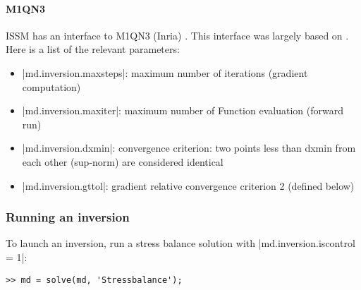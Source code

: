 \paragraph{M1QN3}%
ISSM has an interface to M1QN3 (Inria) \citep{Gilbert1989}. This interface was largely based on \cite{Nardi2009}. Here is a list of the relevant parameters:
\begin{itemize}
	\item \lstinlinebg|md.inversion.maxsteps|: maximum number of iterations (gradient computation)
	\item \lstinlinebg|md.inversion.maxiter|: maximum number of Function evaluation (forward run)
	\item \lstinlinebg|md.inversion.dxmin|:  convergence criterion: two points less than dxmin from each other (sup-norm) are considered identical
	\item \lstinlinebg|md.inversion.gttol|: gradient relative convergence criterion 2 (defined below)
\end{itemize}

\subsubsection{Running an inversion}
To launch an inversion, run a stress balance solution with \lstinlinebg|md.inversion.iscontrol = 1|:
\begin{lstlisting}
>> md = solve(md, 'Stressbalance');
\end{lstlisting}

\clearpage %
